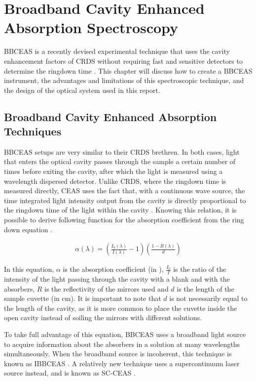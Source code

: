 \chapter{Broadband Cavity Enhanced Absorption Spectroscopy}\label{ch:bbceas}

\acf{BBCEAS} is a recently devised experimental technique that uses the cavity
enhancement factors of \ac{CRDS} without requiring fast and sensitive detectors
to determine the ringdown time \cite{Berden:2009wk}. This chapter  will discuss
how to create a \ac{BBCEAS} instrument, the advantages and limitations of this
spectroscopic technique, and the design of the optical system used in this
report.



\section{Broadband Cavity Enhanced Absorption Techniques}\label{sec:bbceas}

\acl{BBCEAS} setups are very similar to their \ac{CRDS} brethren. In both
cases, light that enters the optical cavity passes through the sample a certain
number of times before exiting the cavity, after which the light is measured
using a wavelength dispersed detector. Unlike \ac{CRDS}, where the ringdown
time is measured directly, \ac{CEAS} uses the fact that, with a continuous wave
source, the time integrated light intensity output from the cavity is directly
proportional to the ringdown time of the light within the cavity
\cite{Engeln:1998uq}.  Knowing this relation, it is possible to derive
following function for the absorption coefficient from the ring down equation \cite{Berden:2009wk}.

  \begin{align*}
    \alpha(\lambda) =
    \left(\frac{I_0(\lambda)}{I(\lambda)}-1\right)\left(\frac{1-R(\lambda)}{d}\right)
  \end{align*}

In this equation, $\alpha$ is the absorption coefficient (in \icm),
$\frac{I_0}{I}$ is the ratio of the intensity of the light passing through the
cavity with a blank and with the absorbers, $R$ is the reflectivity of the
mirrors used and $d$ is the length of the sample cuvette (in cm). It is
important to note that $d$ is not necessarily equal to the length of the
cavity, as it is more common to place the cuvette inside the open cavity
instead of soiling the mirrors with different solutions.

To take full advantage of this equation, \ac{BBCEAS} uses a broadband light
source to acquire information about the absorbers in a solution at many
wavelengths simultaneously. When the broadband source is incoherent, this
technique is known as \acf{IBBCEAS} \cite{Berden:2009wk}. A relatively new
technique uses a supercontinuum laser source instead, and is known as
\acf{SC-CEAS} \cite{Kiwanuka:2010bj}.



